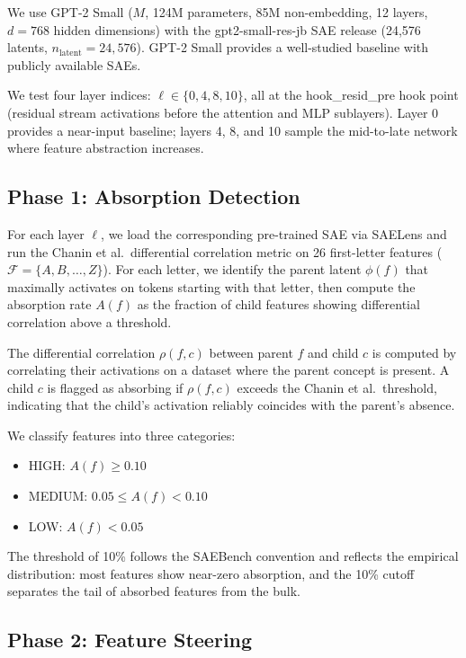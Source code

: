 \documentclass{article}
\begin{document}
We use GPT-2 Small ($M$, 124M parameters, 85M non-embedding, 12 layers, $d = 768$ hidden dimensions) with the gpt2-small-res-jb SAE release (24,576 latents, $n_{\text{latent}} = 24{,}576$). GPT-2 Small provides a well-studied baseline with publicly available SAEs.

We test four layer indices: $\ell \in \{0, 4, 8, 10\}$, all at the hook\_resid\_pre hook point (residual stream activations before the attention and MLP sublayers). Layer 0 provides a near-input baseline; layers 4, 8, and 10 sample the mid-to-late network where feature abstraction increases.

\subsection{Phase 1: Absorption Detection}

For each layer $\ell$, we load the corresponding pre-trained SAE via SAELens and run the Chanin et al.~differential correlation metric on 26 first-letter features ($\mathcal{F} = \{A, B, \ldots, Z\}$). For each letter, we identify the parent latent $\phi(f)$ that maximally activates on tokens starting with that letter, then compute the absorption rate $A(f)$ as the fraction of child features showing differential correlation above a threshold.

The differential correlation $\rho(f, c)$ between parent $f$ and child $c$ is computed by correlating their activations on a dataset where the parent concept is present. A child $c$ is flagged as absorbing if $\rho(f, c)$ exceeds the Chanin et al.~threshold, indicating that the child's activation reliably coincides with the parent's absence.

We classify features into three categories:
\begin{itemize}
    \item HIGH: $A(f) \geq 0.10$
    \item MEDIUM: $0.05 \leq A(f) < 0.10$
    \item LOW: $A(f) < 0.05$
\end{itemize}

The threshold of 10\% follows the SAEBench convention and reflects the empirical distribution: most features show near-zero absorption, and the 10\% cutoff separates the tail of absorbed features from the bulk.

\subsection{Phase 2: Feature Steering}
\end{document}

